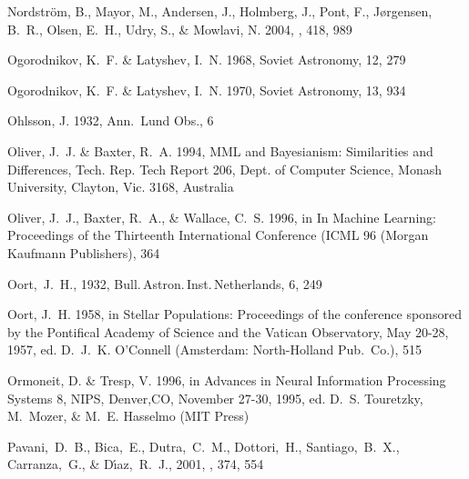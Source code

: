 \begin{thebibliography}{99}
{Nordstr{\"o}m}, B., {Mayor}, M., {Andersen}, J., {Holmberg}, J., {Pont}, F.,
  {J{\o}rgensen}, B.~R., {Olsen}, E.~H., {Udry}, S., \& {Mowlavi}, N. 2004,
  \aap, 418, 989

{Ogorodnikov}, K.~F. \& {Latyshev}, I.~N. 1968, Soviet Astronomy, 12, 279

{Ogorodnikov}, K.~F. \& {Latyshev}, I.~N. 1970, Soviet Astronomy, 13, 934

{Ohlsson}, J. 1932, Ann.~Lund Obs., 6

{Oliver}, J.~J. \& {Baxter}, R.~A. 1994, {MML and Bayesianism: Similarities and
  Differences}, Tech. Rep. Tech Report 206, Dept. of Computer Science, Monash
  University, Clayton, Vic. 3168, Australia

{Oliver}, J.~J., {Baxter}, R.~A., \& {Wallace}, C.~S. 1996, in In Machine
  Learning: Proceedings of the Thirteenth International Conference (ICML 96
  (Morgan Kaufmann Publishers), 364

  Oort,~J.~H., 1932,
  Bull.\,Astron.\,Inst.\,Netherlands, 6, 249

{Oort}, J.~H. 1958, in {Stellar Populations: Proceedings of the conference
  sponsored by the Pontifical Academy of Science and the Vatican Observatory,
  May 20-28, 1957}, ed. D.~J.~K. {O'Connell} ({Amsterdam}: {North-Holland
  Pub.~Co.}), 515

{Ormoneit}, D. \& {Tresp}, V. 1996, in {Advances in Neural Information
  Processing Systems 8, NIPS, Denver,CO, November 27-30, 1995}, ed. D.~S.
  {Touretzky}, M.~{Mozer}, \& M.~E. {Hasselmo} (MIT Press)

  Pavani,~D.~B., Bica,~E., Dutra,~C.~M., Dottori,~H., Santiago,~B.~X., Carranza,~G., \& D{\'{\i}}az,~R.~J., 2001,
  \aap, 374, 554


\end{thebibliography}
